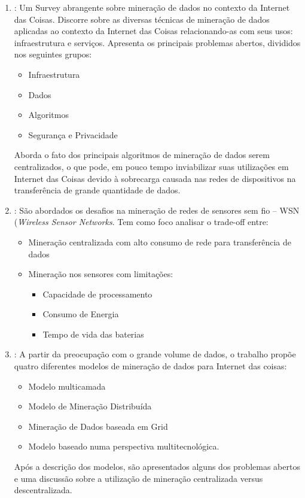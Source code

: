 \begin{enumerate}

    \item \cite{000-000}: Um Survey abrangente sobre mineração de dados no contexto da Internet das Coisas. Discorre sobre as diversas técnicas de mineração de dados aplicadas ao contexto da Internet das Coisas relacionando-as com seus usos: infraestrutura e serviços. Apresenta os principais problemas abertos, divididos nos seguintes grupos: \begin{itemize}
        \item Infraestrutura
        \item Dados
        \item Algoritmos
        \item Segurança e Privacidade
    \end{itemize}
    Aborda o fato dos principais algoritmos de mineração de dados serem centralizados, o que pode, em pouco tempo inviabilizar suas utilizações em Internet das Coisas devido à sobrecarga causada nas redes de dispositivos na transferência de grande quantidade de dados.

    \item \cite{000-014}: São abordados os desafios na mineração de redes de sensores sem fio -- WSN (\textit{Wireless Sensor Networks}. Tem como foco analisar o trade-off entre: \begin{itemize}
        \item Mineração centralizada com alto consumo de rede para transferência de dados
        \item Mineração nos sensores com limitações: \begin{itemize}
            \item Capacidade de processamento
            \item Consumo de Energia
            \item Tempo de vida das baterias
        \end{itemize}
    \end{itemize}
 
    \item \cite {003-000}: A partir da preocupação com o grande volume de dados, o trabalho propõe quatro diferentes modelos de mineração de dados para Internet das coisas: \begin{itemize}
        \item Modelo multicamada
        \item Modelo de Mineração Distribuída
        \item Mineração de Dados baseada em Grid
        \item Modelo baseado numa perspectiva multitecnológica.
    \end{itemize}

    Após a descrição dos modelos, são apresentados alguns dos problemas abertos e uma discussão sobre a utilização de mineração centralizada versus descentralizada. 
    
\end{enumerate}

